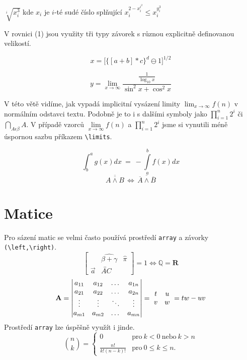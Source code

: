 \documentclass[twocolumn,a4paper,11pt]{article}
\begin{document}
$\sqrt[i]{x_i^3}$  kde $x_i$ je $i$-té sudé číslo splňující  $x_i^{2-x_i^{i^2}} \leq x_i^{y_i^{3}}$
\break
\par V rovnici (1) jsou využity tři typy závorek s různou explicitně definovanou velikostí.


\begin{equation}
x = \biggl[\Big\{ [a+b]*c\Big\}^d\ominus1\biggr]^{1/2}
\end{equation}


$$y = \lim_{ x\to\infty} \frac{\frac{1}{\log_{10} x}}{\sin^2x+\cos^2x}$$



\par V této větě vidíme, jak vypadá implicitní vysázení limity $\lim_{ x\to\infty} f(n)$ v normálním odstavci textu. Podobně je to i s dalšími symboly jako $\prod_{i=1}^n 2^i$ či $\bigcap_{A\epsilon\beta} A$. V případě vzorců $\lim\limits_{ x\to\infty} f(n)$ a $\prod\limits_{i=1}^n 2^i$ jsme si vynutili méně úspornou sazbu příkazem \verb|\limits|.

\begin{equation}
\int_{b}^{a} g(x) dx\ =\ -\int\limits_{a}^{b} f(x) dx
\end{equation}
\begin{equation}
 \overline{\overline{A \land B}} \,\Leftrightarrow \,\overline{\overline{A} \land \overline{B}} 
\end{equation}
\section{Matice}
Pro sázení matic se velmi často používá prostředí \verb|array| a závorky \verb|(\left,\right)|.
$$
\begin{bmatrix}
& \widehat{\beta+\gamma} & \hat{\pi}  \\
\overrightarrow{a}  & \overleftrightarrow{AC}           
\end{bmatrix} 
=  1 \iff \mathbb{Q}  = \mathbf{R}$$
$$
\mathbf{A} =
\begin{vmatrix}
    a_{11} & a_{12}  & \dots  & a_{1n} \\
    a_{21} & a_{22}  & \dots  & a_{2n} \\
    \vdots & \vdots & \ddots & \vdots \\
    a_{m1} & a_{m2}  & \dots  & a_{mn}
\end{vmatrix}
=\
\begin{matrix}
t & u \\
v & w
\end{matrix}
\
=tw - uv
\break
$$
Prostředí \verb|array| lze úspěšně využít i jinde.
$$
\binom{n}{k} = \left\{ \begin{array}{ll}
         0 & \textrm{pro}\ k < 0\ \textrm{nebo}\ k > n\\
        \frac{n!}{k!(n-k)!} & \textrm{pro}\ 0 \leq k \leq n.\end{array} \right.$$
\end{document}
